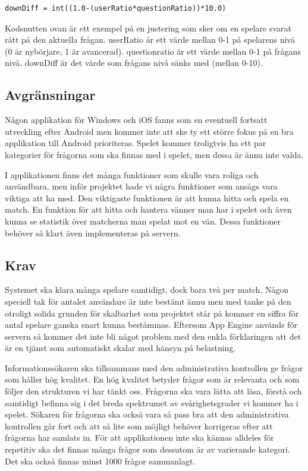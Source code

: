 \documentclass[a4paper, 11pt]{article}
\begin{document}
\begin{verbatim}
downDiff = int((1.0-(userRatio*questionRatio))*10.0)
\end{verbatim}

Kodsnutten ovan är ett exempel på en justering som sker om en spelare svarat rätt på den aktuella frågan. userRatio är ett värde mellan 0-1 på spelarens nivå (0 är nybörjare, 1 är avancerad). questionratio är ett värde mellan 0-1 på frågans nivå. downDiff är det värde som frågans nivå sänks med (mellan 0-10). 

\subsection{Avgränsningar}
Någon applikation för Windows och iOS fanns som en eventuell fortsatt utveckling efter Android men kommer inte att ske ty ett större fokus på en bra applikation till Android prioriteras. Spelet kommer troligtvis ha ett par kategorier för frågorna som ska finnas med i spelet, men dessa är ännu inte valda. 

I applikationen finns det många funktioner som skulle vara roliga och användbara, men inför projektet hade vi några funktioner som ansågs vara viktiga att ha med. Den viktigaste funktionen är att kunna hitta och spela en match. En funktion för att hitta och hantera vänner man har i spelet och även kunna se statistik över matcherna man spelat mot en vän. Dessa funktioner behöver så klart även implementeras på servern.

\subsection{Krav}
Systemet ska klara många spelare samtidigt, dock bara två per match. Någon speciell tak för antalet användare är inte bestämt ännu men med tanke på den otroligt solida grunden för skalbarhet som projektet står på kommer en siffra för antal spelare ganska snart kunna bestämmas. Eftersom App Engine används för servern så kommer det inte bli något problem med den enkla förklaringen att det är en tjänst som automatiskt skalar med hänsyn på belastning. \cite{appenginescalability}

Informationssökaren ska tillsammans med den administrativa kontrollen ge frågor som håller hög kvalitet. En hög kvalitet betyder frågor som är relevanta och som följer den strukturen vi har tänkt oss. Frågorna ska vara lätta att läsa, förstå och samtidigt befinna sig i det breda spektrumet av svårighetsgrader vi kommer ha i spelet. Sökaren för frågorna ska också vara så pass bra att den administrativa kontrollen går fort och att så lite som möjligt behöver korrigeras efter att frågorna har samlats in. För att applikationen inte ska kännas alldeles för repetitiv ska det finnas många frågor som dessutom är av varierande kategori. Det ska också finnas minst 1000 frågor sammanlagt.
\end{document}
